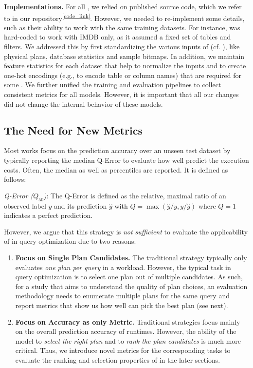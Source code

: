 \textbf{\lcm Implementations.}
For all \lcms, we relied on published source code, which we refer to in our repository\textsuperscript{\ref{code_link}}. 
However, we needed to re-implement some details, such as their ability to work with the same training datasets. 
For instance, \queryformer was hard-coded to work with IMDB only, as it assumed a fixed set of tables and filters. 
We addressed this by first standardizing the various inputs of \lcms (cf. ), like physical plans, database statistics and sample bitmaps. 
In addition, we maintain feature statistics for each dataset that help to normalize the inputs and to create one-hot encodings (e.g., to encode table or column names) that are required for some \lcms.
We further unified the \lcm training and evaluation pipelines to collect consistent metrics for all models.
However, it is important that all our changes did not change the internal behavior of these models.
\subsection{The Need for New Metrics}
Most works focus on the prediction accuracy over an unseen test dataset by typically reporting the median Q-Error to evaluate how well \lcms predict the execution costs. Often, the median as well as percentiles are reported.
It is defined as follows:
\begin{definition}
\textit{Q-Error ($Q_{50}$)}: The Q-Error is defined as the relative, maximal ratio of an observed label $y$ and its prediction $\hat{y}$ with $Q = \max \left( \hat{y}/{y}, y/\hat{y} \right)$ where $Q=1$ indicates a perfect prediction. 
\end{definition}

However, we argue that this strategy is \textit{not sufficient} to evaluate the applicability of \lcms in query optimization due to two reasons:

\begin{enumerate}[leftmargin=*, nosep]
\item \textbf{Focus on Single Plan Candidates.}
The traditional strategy typically only evaluates \textit{one plan per query} in a workload.
However, the typical task in query optimization is to select one plan out of multiple candidates.
As such, for a study that aims to understand the quality of plan choices, an evaluation methodology needs to enumerate multiple plans for the same query and report metrics that show us how well \lcms can pick the best plan (see next). 

\item \textbf{Focus on Accuracy as only Metric.}
Traditional strategies focus mainly on the overall prediction accuracy of runtimes.
However, the ability of the model to \textit{select the right plan} and to \textit{rank the plan candidates} is much more critical.
Thus, we introduce novel metrics for the corresponding tasks to evaluate the ranking and selection properties of \lcms in the later sections. 
\end{enumerate}
